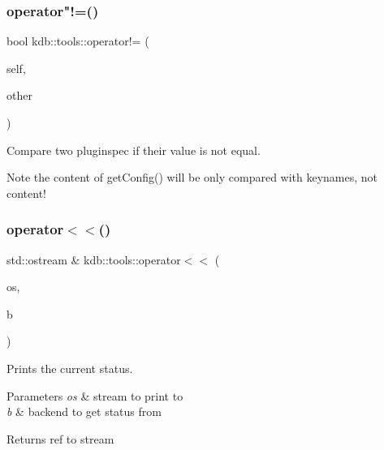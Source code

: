 \subsubsection{\texorpdfstring{operator"!=()}{operator!=()}}
{\footnotesize\ttfamily bool kdb\+::tools\+::operator!= (\begin{DoxyParamCaption}\item[{\mbox{\hyperlink{classkdb_1_1tools_1_1PluginSpec}{Plugin\+Spec}} const \&}]{self,  }\item[{\mbox{\hyperlink{classkdb_1_1tools_1_1PluginSpec}{Plugin\+Spec}} const \&}]{other }\end{DoxyParamCaption})}



Compare two pluginspec if their value is not equal. 

\begin{DoxyNote}{Note}
the content of get\+Config() will be only compared with keynames, not content! 
\end{DoxyNote}
\mbox{\label{namespacekdb_1_1tools_a10b59213ee542e33c7ecc481d4476a79}} 
\subsubsection{\texorpdfstring{operator$<$$<$()}{operator<<()}}
{\footnotesize\ttfamily std\+::ostream \& kdb\+::tools\+::operator$<$$<$ (\begin{DoxyParamCaption}\item[{std\+::ostream \&}]{os,  }\item[{\mbox{\hyperlink{classkdb_1_1tools_1_1Backend}{Backend}} const \&}]{b }\end{DoxyParamCaption})}



Prints the current status. 


\begin{DoxyParams}{Parameters}
{\em os} & stream to print to \\
\hline
{\em b} & backend to get status from\\
\hline
\end{DoxyParams}
\begin{DoxyReturn}{Returns}
ref to stream 
\end{DoxyReturn}
\mbox{\label{namespacekdb_1_1tools_a6f0740b75d32bfea4ef285e18b9a52f4}} 
